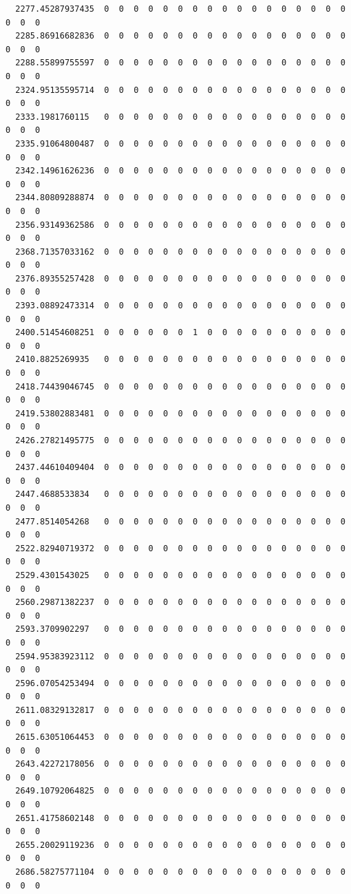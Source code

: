 \documentclass[
  letterpaper,
  DIV=11,
  numbers=noendperiod]{scrartcl}
\begin{document}
\begin{verbatim}
  2277.45287937435  0  0  0  0  0  0  0  0  0  0  0  0  0  0  0  0  0  0  0  0
  2285.86916682836  0  0  0  0  0  0  0  0  0  0  0  0  0  0  0  0  0  0  0  0
  2288.55899755597  0  0  0  0  0  0  0  0  0  0  0  0  0  0  0  0  0  0  0  0
  2324.95135595714  0  0  0  0  0  0  0  0  0  0  0  0  0  0  0  0  0  0  0  0
  2333.1981760115   0  0  0  0  0  0  0  0  0  0  0  0  0  0  0  0  0  0  0  0
  2335.91064800487  0  0  0  0  0  0  0  0  0  0  0  0  0  0  0  0  0  0  0  0
  2342.14961626236  0  0  0  0  0  0  0  0  0  0  0  0  0  0  0  0  0  0  0  0
  2344.80809288874  0  0  0  0  0  0  0  0  0  0  0  0  0  0  0  0  0  0  0  0
  2356.93149362586  0  0  0  0  0  0  0  0  0  0  0  0  0  0  0  0  0  0  0  0
  2368.71357033162  0  0  0  0  0  0  0  0  0  0  0  0  0  0  0  0  0  0  0  0
  2376.89355257428  0  0  0  0  0  0  0  0  0  0  0  0  0  0  0  0  0  0  0  0
  2393.08892473314  0  0  0  0  0  0  0  0  0  0  0  0  0  0  0  0  0  0  0  0
  2400.51454608251  0  0  0  0  0  0  1  0  0  0  0  0  0  0  0  0  0  0  0  0
  2410.8825269935   0  0  0  0  0  0  0  0  0  0  0  0  0  0  0  0  0  0  0  0
  2418.74439046745  0  0  0  0  0  0  0  0  0  0  0  0  0  0  0  0  0  0  0  0
  2419.53802883481  0  0  0  0  0  0  0  0  0  0  0  0  0  0  0  0  0  0  0  0
  2426.27821495775  0  0  0  0  0  0  0  0  0  0  0  0  0  0  0  0  0  0  0  0
  2437.44610409404  0  0  0  0  0  0  0  0  0  0  0  0  0  0  0  0  0  0  0  0
  2447.4688533834   0  0  0  0  0  0  0  0  0  0  0  0  0  0  0  0  0  0  0  0
  2477.8514054268   0  0  0  0  0  0  0  0  0  0  0  0  0  0  0  0  0  0  0  0
  2522.82940719372  0  0  0  0  0  0  0  0  0  0  0  0  0  0  0  0  0  0  0  0
  2529.4301543025   0  0  0  0  0  0  0  0  0  0  0  0  0  0  0  0  0  0  0  0
  2560.29871382237  0  0  0  0  0  0  0  0  0  0  0  0  0  0  0  0  0  0  0  0
  2593.3709902297   0  0  0  0  0  0  0  0  0  0  0  0  0  0  0  0  0  0  0  0
  2594.95383923112  0  0  0  0  0  0  0  0  0  0  0  0  0  0  0  0  0  0  0  0
  2596.07054253494  0  0  0  0  0  0  0  0  0  0  0  0  0  0  0  0  0  0  0  0
  2611.08329132817  0  0  0  0  0  0  0  0  0  0  0  0  0  0  0  0  0  0  0  0
  2615.63051064453  0  0  0  0  0  0  0  0  0  0  0  0  0  0  0  0  0  0  0  0
  2643.42272178056  0  0  0  0  0  0  0  0  0  0  0  0  0  0  0  0  0  0  0  0
  2649.10792064825  0  0  0  0  0  0  0  0  0  0  0  0  0  0  0  0  0  0  0  0
  2651.41758602148  0  0  0  0  0  0  0  0  0  0  0  0  0  0  0  0  0  0  0  0
  2655.20029119236  0  0  0  0  0  0  0  0  0  0  0  0  0  0  0  0  0  0  0  0
  2686.58275771104  0  0  0  0  0  0  0  0  0  0  0  0  0  0  0  0  0  0  0  0

\end{verbatim}
\end{document}
